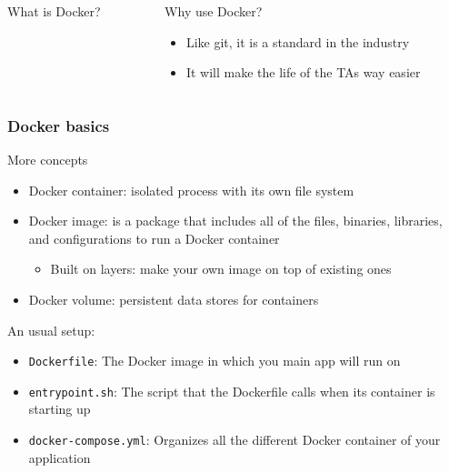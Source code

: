 \documentclass[fleqn,aspectratio=169,10pt]{beamer}
\begin{document}
\begin{frame}
\begin{columns}
\begin{column}{.45\textwidth}
\begin{block}{What is Docker?}
\begin{itemize}
    \end{itemize}
  \end{block}
    \end{column}
    \pause
    \begin{column}{.45\textwidth}
      \begin{block}{Why use Docker?}
        \begin{itemize}
          \item Like git, it is a standard in the industry
          \item It will make the life of the TAs way easier
        \end{itemize}
      \end{block}
    \end{column}
  \end{columns}
\end{frame}

\begin{frame}[fragile]
  \frametitle{Docker basics}
  \pause
  \begin{block}{More concepts}
    \begin{itemize}
      \item Docker container: isolated process with its own file system
      \item Docker image: is a package that includes all of the files, binaries, libraries, and configurations to run a Docker container
            \begin{itemize}
              \item Built on layers: make your own image on top of existing ones
            \end{itemize}
            \item Docker volume: persistent data stores for containers
    \end{itemize}
  \end{block}
  \pause
  \begin{block}{An usual setup:}
    \begin{itemize}
      \item \texttt{Dockerfile}: The Docker image in which you main app will run on
      \item \texttt{entrypoint.sh}: The script that the Dockerfile calls when its container is starting up
      \item \texttt{docker-compose.yml}: Organizes all the different Docker container of your application
    \end{itemize}
  \end{block}
\end{frame}
\end{document}

